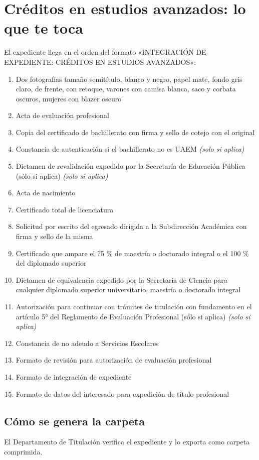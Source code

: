 \section{Créditos en estudios avanzados: lo que te toca}
El expediente llega en el orden del formato «INTEGRACIÓN DE EXPEDIENTE: CRÉDITOS EN ESTUDIOS AVANZADOS»:
\begin{enumerate}
  \item Dos fotografías tamaño semitítulo, blanco y negro, papel mate, fondo gris claro, de frente, con retoque, varones con camisa blanca, saco y corbata oscuros, mujeres con blazer oscuro
  \item Acta de evaluación profesional
  \item Copia del certificado de bachillerato con firma y sello de cotejo con el original
  \item Constancia de autenticación si el bachillerato no es UAEM \emph{(solo si aplica)}
  \item Dictamen de revalidación expedido por la Secretaría de Educación Pública (sólo si aplica) \emph{(solo si aplica)}
  \item Acta de nacimiento
  \item Certificado total de licenciatura
  \item Solicitud por escrito del egresado dirigida a la Subdirección Académica con firma y sello de la misma
  \item Certificado que ampare el 75 \% de maestría o doctorado integral o el 100 \% del diplomado superior
  \item Dictamen de equivalencia expedido por la Secretaría de Ciencia para cualquier diplomado superior universitario, maestría o doctorado integral
  \item Autorización para continuar con trámites de titulación con fundamento en el artículo 5° del Reglamento de Evaluación Profesional (sólo si aplica) \emph{(solo si aplica)}
  \item Constancia de no adeudo a Servicios Escolares
  \item Formato de revisión para autorización de evaluación profesional
  \item Formato de integración de expediente
  \item Formato de datos del interesado para expedición de título profesional
\end{enumerate}
\subsection{Cómo se genera la carpeta}
El Departamento de Titulación verifica el expediente y lo exporta como carpeta comprimida.
